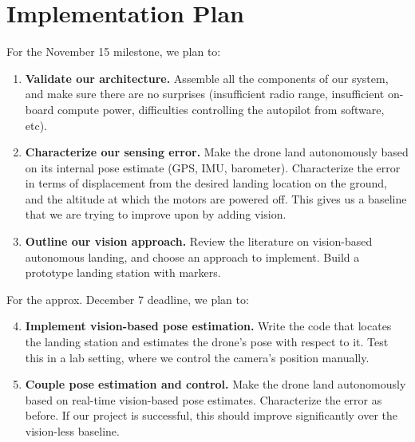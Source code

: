 \section*{Implementation Plan}

For the November 15 milestone, we plan to:

\begin{enumerate}

\item {\bf Validate our architecture.} Assemble all the components of our
system, and make sure there are no surprises (insufficient radio range,
insufficient on-board compute power, difficulties controlling the autopilot
from software, etc).

\item {\bf Characterize our sensing error.} Make the drone land autonomously
based on its internal pose estimate (GPS, IMU, barometer). Characterize the
error in terms of displacement from the desired landing location on the ground,
and the altitude at which the motors are powered off. This gives us a baseline
that we are trying to improve upon by adding vision.

\item {\bf Outline our vision approach.} Review the literature on vision-based
autonomous landing, and choose an approach to implement. Build a prototype
landing station with markers.

\end{enumerate}

\noindent
For the approx. December 7 deadline, we plan to:

\begin{enumerate}
\setcounter{enumi}{3}

\item {\bf Implement vision-based pose estimation.} Write the code that locates
the landing station and estimates the drone's pose with respect to it. Test
this in a lab setting, where we control the camera's position manually.

\item {\bf Couple pose estimation and control.} Make the drone land
autonomously based on real-time vision-based pose estimates. Characterize the
error as before. If our project is successful, this should improve
significantly over the vision-less baseline.

\end{enumerate}
